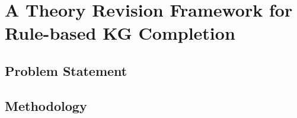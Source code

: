 \chapter{A Theory Revision Framework for Rule-based KG Completion}
\label{chap:frame}

\section{Problem Statement}

\section{Methodology}